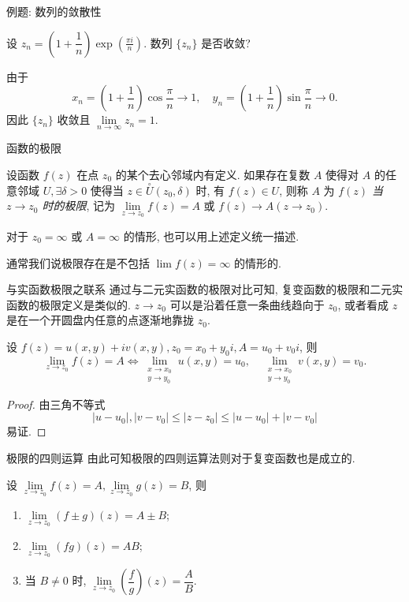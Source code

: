 \begin{frame}{例题: 数列的敛散性}
\begin{example}
设 $z_n=\left(1+\dfrac1n\right)\exp\left(\frac{\pi i}n\right)$. 数列 $\{z_n\}$ 是否收敛?
\end{example}
\begin{solution}
由于
\[x_n=\left(1+\frac1n\right)\cos\frac\pi n\to 1,\quad
y_n=\left(1+\frac1n\right)\sin\frac\pi n\to 0.\]
\onslide<+->
因此 $\{z_n\}$ 收敛且 $\lim\limits_{n\to\infty}z_n=1$.
\end{solution}
\end{frame}


\begin{frame}{函数的极限}
\begin{definition}
设函数 $f(z)$ 在点 $z_0$ 的某个去心邻域内有定义.
\onslide<+->
如果存在复数 $A$ 使得对 $A$ 的任意邻域 $U,\exists\delta>0$ 使得当 $z\in\stackrel\circ U(z_0,\delta)$ 时, 有 $f(z)\in U$, 则称 $A$ 为 \emph{$f(z)$ 当 $z\to z_0$ 时的极限}, 记为 \emph{$\lim\limits_{z\to z_0}f(z)=A$} 或 \emph{$f(z)\to A (z\to z_0)$}.
\end{definition}

\onslide<+->
对于 $z_0=\infty$ 或 $A=\infty$ 的情形, 也可以用上述定义统一描述.

\onslide<+->
通常我们说极限存在是不包括 $\lim f(z)=\infty$ 的情形的.
\end{frame}


\begin{frame}{与实函数极限之联系}
\onslide<+->
通过与二元实函数的极限对比可知, 复变函数的极限和二元实函数的极限定义是类似的.
\onslide<+->
$z\to z_0$ 可以是沿着任意一条曲线趋向于 $z_0$, 或者看成 $z$ 是在一个开圆盘内任意的点逐渐地靠拢 $z_0$.

\begin{theorem}
设 $f(z)=u(x,y)+iv(x,y),z_0=x_0+y_0i,A=u_0+v_0i$, 则
\[\lim_{z\to z_0}f(z)=A\iff
\lim_{\substack{x\to x_0\\y\to y_0}}u(x,y)=u_0,\quad
\lim_{\substack{x\to x_0\\y\to y_0}}v(x,y)=v_0.\]
\vspace{-0.5\baselineskip}
\end{theorem}

\begin{proof}
由三角不等式
\[|u-u_0|,|v-v_0|\le|z-z_0|\le|u-u_0|+|v-v_0|\]
易证.
\end{proof}
\end{frame}


\begin{frame}{极限的四则运算}
\onslide<+->
由此可知极限的四则运算法则对于复变函数也是成立的.
\begin{theorem}
设 $\lim\limits_{z\to z_0}f(z)=A,\lim\limits_{z\to z_0}g(z)=B$, 则
\begin{enumerate}
\item $\lim\limits_{z\to z_0}(f\pm g)(z)=A\pm B$;
\item $\lim\limits_{z\to z_0}(fg)(z)=AB$;
\item 当 $B\neq 0$ 时, $\lim\limits_{z\to z_0}\left(\dfrac fg\right)(z)=\dfrac AB$.
\end{enumerate}
\end{theorem}
\end{frame}


